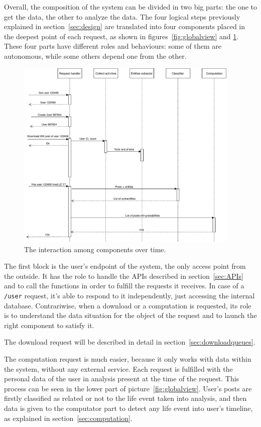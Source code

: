 Overall, the composition of the system can be divided in two big parts: the one to get the data, the other to analyze the data. The four logical steps previously explained in section~\ref{sec:design} are translated into four components placed in the deepest point of each request, as shown in figures~\ref{fig:globalview} and \ref{fig:interaction}. These four parts have different roles and behaviours: some of them are autonomous, while some others depend one from the other.

\begin{figure}
\centering
\includegraphics[width=%
0.95\textwidth]{img/Interaction}
\caption{The interaction among components over time.}
\label{fig:interaction}
\end{figure}

The first block is the user's endpoint of the system, the only access point from the outside. It has the role to handle the APIs described in section~\ref{sec:APIs} and to call the functions in order to fulfill the requests it receives. In case of a \texttt{/user} request, it's able to respond to it independently, just accessing the internal database. Contrariwise, when a download or a computation is requested, its role is to understand the data situation for the object of the request and to launch the right component to satisfy it.

The download request will be described in detail in section~\ref{sec:downloadqueues}.

The computation request is much easier, because it only works with data within the system, without any external service. Each request is fulfilled with the personal data of the user in analysis present at the time of the request. This process can be seen in the lower part of picture~\ref{fig:globalview}. User's posts are firstly classified as related or not to the life event taken into analysis, and then data is given to the computator part to detect any life event into user's timeline, as explained in section~\ref{sec:computation}. 

